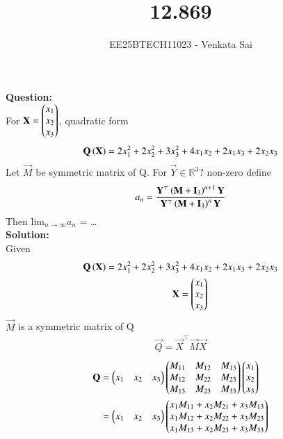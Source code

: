 \documentclass[journal]{IEEEtran}
\begin{document}


\title{12.869}
\author{EE25BTECH11023 - Venkata Sai}
\maketitle 
\renewcommand{\thefigure}{\theenumi}
\renewcommand{\thetable}{\theenumi}
\setlength{\intextsep}{10pt} %

\renewcommand{\thetable}{\theenumi}
\vspace{-1em}
\textbf{Question:}  \\
For $\mathbf{X}=\begin{pmatrix}x_1\\x_2\\x_3\end{pmatrix}$, quadratic form
\begin{align}
\mathbf{Q\left(\mathbf{X}\right)} = 2x^2_1 + 2x^2_2 + 3x^2_3 + 4x_1x_2 + 2x_1x_3 + 2x_2x_3
\end{align}
Let $\vec{M}$ be symmetric matrix of Q. For $\vec{Y} \in \mathbb{R}^3$? non-zero define 
\begin{align}
    a_n=\frac{\mathbf{Y}^\top\left(\mathbf{M}+\mathbf{I}_3\right)^{n+1}\mathbf{Y}}{\mathbf{Y}^\top\left(\mathbf{M}+\mathbf{I}_3\right)^{n}\mathbf{Y}}
\end{align}
Then lim$_{n\rightarrow\infty}a_n$ = \dots  \\
\textbf{Solution:}  \\
 Given
 \begin{align}
 \mathbf{Q\left(\mathbf{X}\right)} = 2x^2_1 + 2x^2_2 + 3x^2_3 &+ 4x_1x_2 + 2x_1x_3 + 2x_2x_3  \\
 \mathbf{X}&=\begin{pmatrix}x_1\\x_2\\x_3\end{pmatrix}
 \end{align}
 $\vec{M}$ is a symmetric matrix of Q
\begin{align}
     \vec{Q}=\vec{X}^\top\vec{M}\vec{X} 
     \end{align}
     \begin{align}
          \mathbf{Q}  &=\begin{pmatrix}x_1 & x_2 & x_3\end{pmatrix}\begin{pmatrix}M_{11} & M_{12} & M_{13}\\M_{12} &M_{22} &M_{23}\\M_{13} &M_{23}&M_{33}\end{pmatrix}\begin{pmatrix}x_1\\x_2\\x_3\end{pmatrix} \\
            &=\begin{pmatrix}x_1&x_2&x_3\end{pmatrix}\begin{pmatrix} x_1 M_{11} + x_2 M_{21} + x_3 M_{13} \\ x_1 M_{12} + x_2 M_{22} + x_3 M_{23} \\x_1 M_{13} + x_2 M_{23} + x_3 M_{33}\end{pmatrix}
            \end{align}
\end{document}
